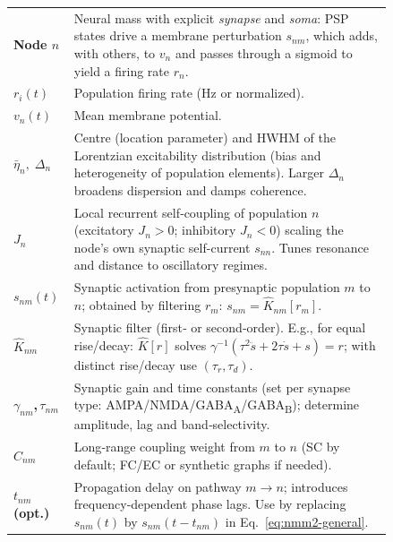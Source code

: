 \documentclass[12pt]{article}
\numberwithin{equation}{section}
\newcommand{\rev}[1]{\begingroup\color{navyblue}#1\endgroup}
\begin{document}
\begin{tcolorbox}[
  colback=gray!5,
  colframe=slate,
  colbacktitle=softblue!25,
  coltitle=softblue!60!black,
  fonttitle=\bfseries\small,
  title={
  \small \textit{NMM2  Network (Eq.~\ref{eq:nmm2-general})} \\ Whole-brain Simulations Parameters \& Physiological Meaning
  },
  boxrule=0.4pt, enhanced, sharp corners,
  left=4pt,right=4pt,top=3pt,bottom=3pt,
  boxsep=2pt, before skip=6pt, after skip=6pt
]
\scriptsize
\begin{tabular}{@{}l p{0.84\linewidth}@{}}
\textbf{Node $n$} & Neural mass with explicit \emph{synapse} and \emph{soma}: PSP states drive a membrane perturbation $s_{nm}$, which adds, with others, to $v_n$ and passes through a sigmoid to yield a firing rate $r_n$.\\
\textbf{$r_i(t)$}  & Population firing rate (Hz or normalized).  \\
\textbf{$v_n(t)$} & Mean membrane potential.  \\
\textbf{$\bar\eta_n,\;\Delta_n$} & \rev{Centre (location parameter) and HWHM} of the Lorentzian excitability distribution (bias and heterogeneity of population elements). Larger $\Delta_n$ broadens dispersion and damps coherence.\\
\textbf{$J_n$} & Local recurrent self‑coupling of population $n$ (excitatory $J_n\!>\!0$; inhibitory $J_n\!<\!0$) scaling the node’s own synaptic self-current $s_{nn}$. Tunes resonance and distance to oscillatory regimes.\\
\textbf{$s_{nm}(t)$} & Synaptic activation from presynaptic population $m$ to $n$; obtained by filtering $r_m$: $s_{nm}=\hat K_{nm}[r_m]$.\\
\textbf{$\hat K_{nm}$} & Synaptic filter (first‑ or second‑order). E.g., for equal rise/decay: $\hat K[r]$ solves $\gamma^{-1}(\tau^2\ddot s+2\tau\dot s+s)=r$; with distinct rise/decay use $(\tau_r,\tau_d)$.\\
\textbf{$\gamma_{nm}$,\,$\tau_{nm}$} & Synaptic gain and time constants (set per synapse type: AMPA/NMDA/GABA\textsubscript{A}/GABA\textsubscript{B}); determine amplitude, lag and band‑selectivity.\\
\textbf{$C_{nm}$} & Long‑range coupling weight from $m$ to $n$ (SC by default; FC/EC or synthetic graphs if needed).\\
\textbf{$t_{nm}$ (opt.)} & Propagation delay on pathway $m{\to}n$; introduces frequency‑dependent phase lags. Use by replacing $s_{nm}(t)$ by $s_{nm}(t-t_{nm})$ in Eq.~\ref{eq:nmm2-general}.\\

\end{tabular}
\end{tcolorbox}
\end{document}
